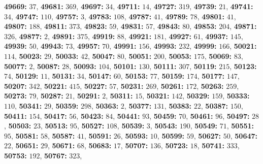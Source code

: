 \textsf{\bfseries 49669:} $37$, \textsf{\bfseries 49681:} $369$, \textsf{\bfseries 49697:} $34$, \textsf{\bfseries 49711:} $14$, \textsf{\bfseries 49727:} $319$, \textsf{\bfseries 49739:} $21$, \textsf{\bfseries 49741:} $34$, \textsf{\bfseries 49747:} $110$, \textsf{\bfseries 49757:} $3$, \textsf{\bfseries 49783:} $108$, \textsf{\bfseries 49787:} $41$, \textsf{\bfseries 49789:} $78$, \textsf{\bfseries 49801:} $41$, \textsf{\bfseries 49807:} $188$, \textsf{\bfseries 49811:} $373$, \textsf{\bfseries 49823:} $59$, \textsf{\bfseries 49831:} $57$, \textsf{\bfseries 49843:} $80$, \textsf{\bfseries 49853:} $204$, \textsf{\bfseries 49871:} $326$, \textsf{\bfseries 49877:} $2$, \textsf{\bfseries 49891:} $375$, \textsf{\bfseries 49919:} $88$, \textsf{\bfseries 49921:} $181$, \textsf{\bfseries 49927:} $61$, \textsf{\bfseries 49937:} $145$, \textsf{\bfseries 49939:} $50$, \textsf{\bfseries 49943:} $73$, \textsf{\bfseries 49957:} $70$, \textsf{\bfseries 49991:} $156$, \textsf{\bfseries 49993:} $232$, \textsf{\bfseries 49999:} $166$, \textsf{\bfseries 50021:} $114$, \textsf{\bfseries 50023:} $29$, \textsf{\bfseries 50033:} $42$, \textsf{\bfseries 50047:} $80$, \textsf{\bfseries 50051:} $200$, \textsf{\bfseries 50053:} $175$, \textsf{\bfseries 50069:} $83$, \textsf{\bfseries 50077:} $2$, \textsf{\bfseries 50087:} $28$, \textsf{\bfseries 50093:} $104$, \textsf{\bfseries 50101:} $130$, \textsf{\bfseries 50111:} $307$, \textsf{\bfseries 50119:} $215$, \textsf{\bfseries 50123:} $74$, \textsf{\bfseries 50129:} $11$, \textsf{\bfseries 50131:} $34$, \textsf{\bfseries 50147:} $60$, \textsf{\bfseries 50153:} $77$, \textsf{\bfseries 50159:} $174$, \textsf{\bfseries 50177:} $147$, \textsf{\bfseries 50207:} $342$, \textsf{\bfseries 50221:} $415$, \textsf{\bfseries 50227:} $57$, \textsf{\bfseries 50231:} $269$, \textsf{\bfseries 50261:} $172$, \textsf{\bfseries 50263:} $259$, \textsf{\bfseries 50273:} $79$, \textsf{\bfseries 50287:} $21$, \textsf{\bfseries 50291:} $2$, \textsf{\bfseries 50311:} $15$, \textsf{\bfseries 50321:} $142$, \textsf{\bfseries 50329:} $159$, \textsf{\bfseries 50333:} $110$, \textsf{\bfseries 50341:} $29$, \textsf{\bfseries 50359:} $298$, \textsf{\bfseries 50363:} $2$, \textsf{\bfseries 50377:} $131$, \textsf{\bfseries 50383:} $22$, \textsf{\bfseries 50387:} $150$, \textsf{\bfseries 50411:} $154$, \textsf{\bfseries 50417:} $56$, \textsf{\bfseries 50423:} $84$, \textsf{\bfseries 50441:} $93$, \textsf{\bfseries 50459:} $70$, \textsf{\bfseries 50461:} $96$, \textsf{\bfseries 50497:} $28$, \textsf{\bfseries 50503:} $23$, \textsf{\bfseries 50513:} $95$, \textsf{\bfseries 50527:} $108$, \textsf{\bfseries 50539:} $3$, \textsf{\bfseries 50543:} $190$, \textsf{\bfseries 50549:} $71$, \textsf{\bfseries 50551:} $95$, \textsf{\bfseries 50581:} $58$, \textsf{\bfseries 50587:} $41$, \textsf{\bfseries 50591:} $26$, \textsf{\bfseries 50593:} $10$, \textsf{\bfseries 50599:} $59$, \textsf{\bfseries 50627:} $50$, \textsf{\bfseries 50647:} $22$, \textsf{\bfseries 50651:} $29$, \textsf{\bfseries 50671:} $68$, \textsf{\bfseries 50683:} $17$, \textsf{\bfseries 50707:} $136$, \textsf{\bfseries 50723:} $18$, \textsf{\bfseries 50741:} $333$, \textsf{\bfseries 50753:} $192$, \textsf{\bfseries 50767:} $323$, 
